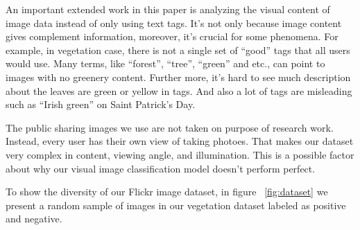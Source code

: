 
An important extended work in this paper is analyzing the visual content of image data instead of
only using text tags. It's not only because image content gives complement information, moreover,
 it's crucial for some phenomena. For example, in vegetation case, 
there is not a single set of ``good''
tags that all users would use. Many terms, like ``forest'', ``tree'', ``green'' and etc., can point to images with no greenery content.
Further more, it's hard to see much description about the leaves are green or yellow in tags.
And also a lot of tags are misleading such as ``Irish green'' on Saint Patrick's Day. 




The public sharing images we use are not taken on purpose of research work. Instead, every user has their own view of taking photoes. That makes our dataset very complex in content, viewing angle, and illumination. This is a possible factor about why our visual image classification model doesn't perform perfect. 

To show the diversity of our Flickr image dataset, in figure ~\ref{fig:dataset} we present a random sample of images in our vegetation dataset labeled as positive and negative.

